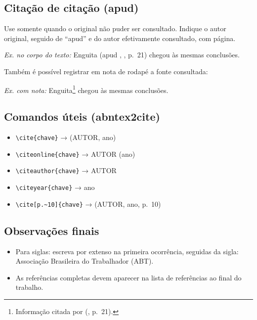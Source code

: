 \subsection{Citação de citação (apud)}
Use somente quando o original não puder ser consultado. Indique o autor original, seguido de ``apud'' e do autor efetivamente consultado, com página.
\begin{flushleft}
\textit{Ex. no corpo do texto:} Enguita (apud \citeauthor{silva1991}, \citeyear{silva1991}, p.~21) chegou às mesmas conclusões.
\end{flushleft}

Também é possível registrar em nota de rodapé a fonte consultada:
\begin{flushleft}
\textit{Ex. com nota:} Enguita\footnote{Informação citada por \citeauthor{silva1991} (\citeyear{silva1991}, p.~21).} chegou às mesmas conclusões.
\end{flushleft}

\subsection{Comandos úteis (abntex2cite)}
\begin{itemize}
  \item \verb|\cite{chave}| → (AUTOR, ano)
  \item \verb|\citeonline{chave}| → AUTOR (ano)
  \item \verb|\citeauthor{chave}| → AUTOR
  \item \verb|\citeyear{chave}| → ano
  \item \verb|\cite[p.~10]{chave}| → (AUTOR, ano, p.~10)
\end{itemize}

\subsection{Observações finais}
\begin{itemize}
  \item Para siglas: escreva por extenso na primeira ocorrência, seguidas da sigla: Associação Brasileira do Trabalhador (ABT).
  \item As referências completas devem aparecer na lista de referências ao final do trabalho.
\end{itemize}

